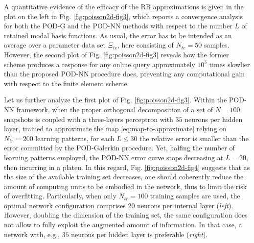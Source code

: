 \documentclass{elsarticle}
\numberwithin{equation}{section}
\theoremstyle{theorem}
\theoremstyle{definition}
\theoremstyle{remark}
\theoremstyle{proposition}
\numberwithin{figure}{section}
\newcommand{\bg}[1]{\boldsymbol{#1}}
\begin{document}
		A quantitative evidence of the efficacy of the RB approximations is given in the plot on the left in Fig. \ref{fig:poisson2d-fig3}, which reports a convergence analysis for both the POD-G and the POD-NN methods with respect to the number $L$ of retained modal basis functions. As usual, the error has to be intended as an average over a parameter data set $\Xi_{te}$, here consisting of $N_{te} = 50$ samples. However, the second plot of Fig. \ref{fig:poisson2d-fig3} reveals how the former scheme produces a response for any online query approximately $10^3$ times slowlier than the proposed POD-NN procedure does, preventing any computational gain with respect to the finite element scheme. %
		
		Let us further analyze the first plot of Fig. \ref{fig:poisson2d-fig3}. Within the POD-NN framework, when the proper orthogonal decomposition of a set of $N = 100$ snapshots is coupled with a three-layers perceptron with $35$ neurons per hidden layer, trained to approximate the map \eqref{eq:map-to-approximate} relying on $N_{tr} = 200$ learning patterns, for each $L \leq 30$ the relative error is smaller than the error committed by the POD-Galerkin procedure. Yet, halfing the number of learning patterns employed, the POD-NN error curve stops decreasing at $L = 20$, then incurring in a plateu. In this regard, Fig. \ref{fig:poisson2d-fig4} suggests that as the size of the available training set decreases, one should coherently reduce the amount of computing units to be embodied in the network, thus to limit the risk of overfitting. Particularly, when only $N_{tr} = 100$ training samples are used, the optimal network configuration comprises $20$ neurons per internal layer (\emph{left}). However, doubling the dimension of the training set, the same configuration does not allow to fully exploit the augmented amount of information. In that case, a network with, e.g., $35$ neurons per hidden layer is preferable (\emph{right}). 
								
\end{document}
